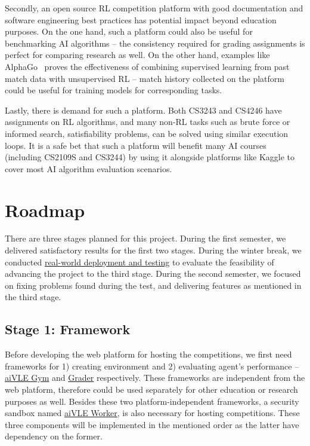 Secondly, an open source RL competition platform with good documentation and software engineering best practices has potential impact beyond education purposes. On the one hand, such a platform could also be useful for benchmarking AI algorithms – the consistency required for grading assignments is perfect for comparing research as well. On the other hand, examples like AlphaGo~\parencite{alphago} proves the effectiveness of combining supervised learning from past match data with unsupervised RL – match history collected on the platform could be useful for training models for corresponding tasks. 

Lastly, there is demand for such a platform. Both CS3243 and CS4246 have assignments on RL algorithms, and many non-RL tasks such as brute force or informed search, satisfiability problems, can be solved using similar execution loops. It is a safe bet that such a platform will benefit many AI courses (including CS2109S and CS3244) by using it alongside platforms like Kaggle to cover most AI algorithm evaluation scenarios.

\section{Roadmap}
\label{s:project-objective-roadmap}
There are three stages planned for this project. During the first semester, we delivered satisfactory results for the first two stages. During the winter break, we conducted \hyperref[ch:deployment-and-testing]{real-world deployment and testing} to evaluate the feasibility of advancing the project to the third stage. During the second semester, we focused on fixing problems found during the test, and delivering features as mentioned in the third stage.

\subsection{Stage 1: Framework}
Before developing the web platform for hosting the competitions, we first need frameworks for 1) creating environment and 2) evaluating agent’s performance – \hyperref[ch:aivle-gym]{aiVLE Gym} and \hyperref[ch:aivle-grader]{Grader} respectively. These frameworks are independent from the web platform, therefore could be used separately for other education or research purposes as well.
Besides these two platform-independent frameworks, a security sandbox named \hyperref[ch:aivle-worker]{aiVLE Worker}, is also necessary for hosting competitions. These three components will be implemented in the mentioned order as the latter have dependency on the former.

